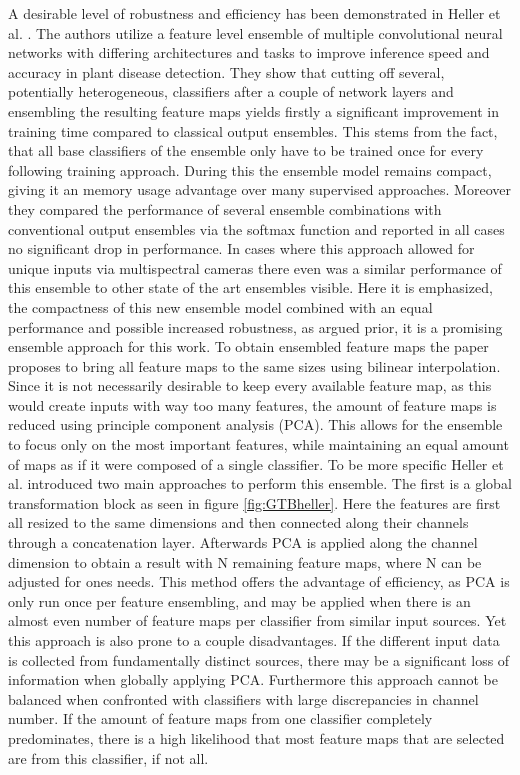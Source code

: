 A desirable level of robustness and efficiency has been demonstrated in Heller et al. \cite{EnsembleHeller2023}. The authors utilize a feature level ensemble of multiple 
convolutional neural networks with differing architectures and tasks to improve inference speed and accuracy in plant disease detection.
They show that cutting off several, potentially heterogeneous, classifiers after a couple of network layers and ensembling the 
resulting feature maps yields firstly a significant improvement in training time compared to classical output ensembles. This stems from 
the fact, that all base classifiers of the ensemble only have to be trained once for every following training approach. During this the ensemble 
model remains compact, giving it an memory usage advantage over many supervised approaches. 
Moreover they compared the performance of several ensemble combinations with conventional 
output ensembles via the softmax function and reported in all cases no significant drop in performance. In cases where this approach allowed for 
unique inputs via multispectral cameras \cite{EnsembleHeller2023} there even was a similar performance of this ensemble to other state of the 
art ensembles visible. Here it is emphasized, the compactness of this new ensemble model combined with an equal performance and possible 
increased robustness, as argued prior, it is a promising ensemble approach for this work.\newline
To obtain ensembled feature maps the paper proposes to bring all feature maps to the same sizes using bilinear interpolation. Since 
it is not necessarily desirable to keep every available feature map, as this would create inputs with way too many features, the amount of feature 
maps is reduced using principle component analysis (PCA). This allows for the ensemble to focus only on the most important features, while maintaining 
an equal amount of maps as if it were composed of a single classifier. To be more specific Heller et al. \cite{EnsembleHeller2023} introduced two main 
approaches to perform this ensemble. The first is a global transformation block as seen in figure \ref{fig:GTBheller}. 
Here the features are first all resized to the same dimensions and then connected along their channels through a concatenation layer.
Afterwards PCA is applied along the channel dimension to obtain a result with N remaining feature maps, where N can be adjusted for ones 
needs. This method offers the advantage of efficiency, as PCA is only run once per feature ensembling, and may be applied when there is 
an almost even number of feature maps per classifier from similar input sources. Yet this approach is also 
prone to a couple disadvantages. If the different input data is collected from fundamentally distinct sources, there may be a significant 
loss of information when globally applying PCA. Furthermore this approach cannot be balanced when confronted with classifiers with large 
discrepancies in channel number. If the amount of feature maps from one classifier completely predominates, there is a high likelihood 
that most feature maps that are selected are from this classifier, if not all.

